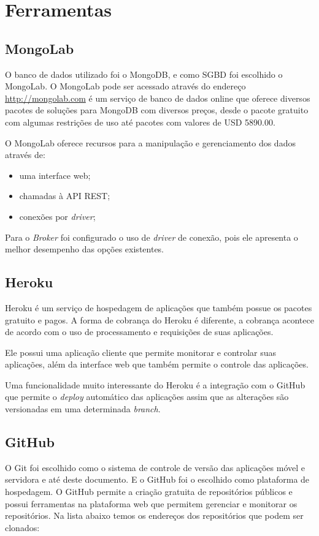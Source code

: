 \section{Ferramentas}
\subsection{MongoLab}
O banco de dados utilizado foi o MongoDB, e como SGBD foi escolhido o MongoLab.
O MongoLab pode ser acessado através do endereço \url{http://mongolab.com} é um serviço de banco de dados online que oferece diversos pacotes de soluções para MongoDB com diversos preços, desde o pacote gratuito com algumas restrições de uso até pacotes com valores de USD 5890.00.

O MongoLab oferece recursos para a manipulação e gerenciamento dos dados através de:
\begin{footnotesize}
  \begin{itemize}
  \item uma interface web;
  \item chamadas à API REST;
  \item conexões por \textit{driver};
  \end{itemize}
\end{footnotesize}

Para o \textit{Broker} foi configurado o uso de \textit{driver} de conexão, pois ele apresenta o melhor desempenho das opções existentes.

\subsection{Heroku}
Heroku é um serviço de hospedagem de aplicações que também possue os pacotes gratuito e pagos. A forma de cobrança do Heroku é diferente, a cobrança acontece de acordo com o uso de processamento e requisições de suas aplicações.

Ele possui uma aplicação cliente que permite monitorar e controlar suas aplicações, além da interface web que também permite o controle das aplicações.

Uma funcionalidade muito interessante do Heroku é a integração com o GitHub que permite o \textit{deploy} automático das aplicações assim que as alterações são versionadas em uma determinada \textit{branch}.

\subsection{GitHub}
O Git foi escolhido como o sistema de controle de versão das aplicações móvel e servidora e até deste documento. E o GitHub foi o escolhido como plataforma de hospedagem.
O GitHub permite a criação gratuita de repositórios públicos e possui ferramentas na plataforma web que permitem gerenciar e monitorar os repositórios.
Na lista abaixo temos os endereços dos repositórios que podem ser clonados:

